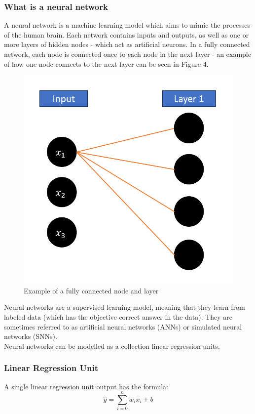 \documentclass{article}
\begin{document}
    \subsubsection{What is a neural network}
    A neural network is a machine learning model which aims to mimic the processes of the human brain.
    Each network contains inputs and outputs, as well as one or more layers of hidden nodes - which act as artificial neurons.
    In a fully connected network, each node is connected once to each node in the next layer - an example of how one node connects
    to the next layer can be seen in Figure 4.
    \begin{figure}[h]
        \centering
        \includegraphics[scale=0.2]{ConnectedNode.png}
        \caption{Example of a fully connected node and layer}
    \end{figure}

    Neural networks are a supervised learning model, meaning that they learn from labeled data (which has the objective correct answer in the data).
    They are sometimes referred to as artificial neural networks (ANNs) or simulated neural networks (SNNs).\\

    Neural networks can be modelled as a collection linear regression units.

    \subsubsection{Linear Regression Unit}
    A single linear regression unit output has the formula:
    \begin{displaymath}
        \hat{y} = \sum_{i=0}^{n} w_ix_i + b
    \end{displaymath}
\end{document}

